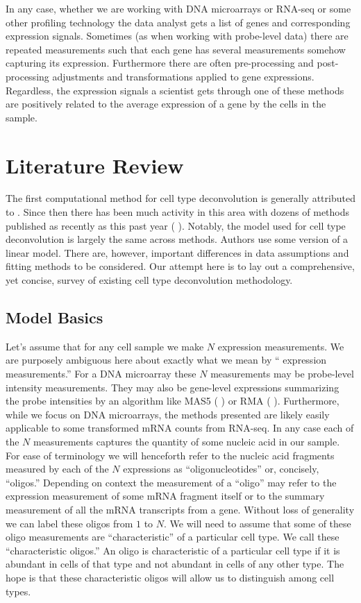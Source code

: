\documentclass[reqno,12pt,oneside]{report}\usepackage[]{graphicx}\usepackage[]{color}
\renewcommand{\citet}[1]{(\citeauthor{#1} \citeyear{#1})}
\theoremstyle{plain}
\theoremstyle{definition}
\theoremstyle{remark}
\numberwithin{theorem}{chapter}     %
\begin{document}
In any case, whether we are working with DNA microarrays or RNA-seq or some other profiling technology the data analyst gets a list of genes and corresponding expression signals. Sometimes (as when working with probe-level data) there are repeated measurements such that each gene has several measurements somehow capturing its expression. Furthermore there are often pre-processing and post-processing adjustments and transformations applied to gene expressions. Regardless, the expression signals a scientist gets through one of these methods are positively related to the average expression of a gene by the cells in the sample. 

 \chapter{Literature Review}
 \label{chap:Lit}

The first computational method for cell type deconvolution is generally attributed to \cite{Venet2001}. Since then there has been much activity in this area with dozens of methods published as recently as this past year \citet{Newman2015}. Notably, the model used for cell type deconvolution is largely the same across methods. Authors use some version of a linear model. There are, however, important differences in data assumptions and fitting methods to be considered. Our attempt here is to lay out a comprehensive, yet concise, survey of existing cell type deconvolution methodology.

\section{Model Basics}

Let's assume that for any cell sample we make $N$ expression measurements. We are purposely ambiguous here about exactly what we mean by `` expression measurements.'' For a DNA microarray these $N$ measurements may be probe-level intensity measurements. They may also be gene-level expressions summarizing the probe intensities by an algorithm like MAS5 \citet{Hubbell2002} or RMA \citet{Irizarry2003}. Furthermore, while we focus on DNA microarrays, the methods presented are likely easily applicable to some transformed mRNA counts from RNA-seq. In any case each of the $N$ measurements captures the quantity of some nucleic acid in our sample. For ease of terminology we will henceforth refer to the nucleic acid fragments measured by each of the $N$ expressions as ``oligonucleotides'' or, concisely, ``oligos.'' Depending on context the measurement of a ``oligo'' may refer to the expression measurement of some mRNA fragment itself or to the summary measurement of all the mRNA transcripts from a gene. Without loss of generality we can label these oligos from $1$ to $N$. We will need to assume that some of these oligo measurements are ``characteristic'' of a particular cell type. We call these ``characteristic oligos.'' An oligo is characteristic of a particular cell type if it is abundant in cells of that type and not abundant in cells of any other type. The hope is that these characteristic oligos will allow us to distinguish among cell types. 
\end{document}
